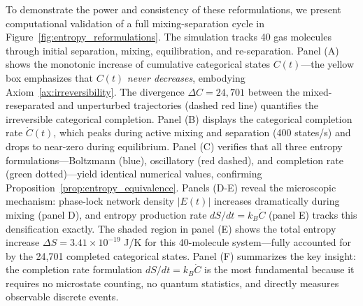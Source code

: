 To demonstrate the power and consistency of these reformulations, we present computational validation of a full mixing-separation cycle in Figure~\ref{fig:entropy_reformulations}. The simulation tracks 40 gas molecules through initial separation, mixing, equilibration, and re-separation. Panel (A) shows the monotonic increase of cumulative categorical states $C(t)$—the yellow box emphasizes that $C(t)$ \emph{never decreases}, embodying Axiom~\ref{ax:irreversibility}. The divergence $\Delta C = 24{,}701$ between the mixed-reseparated and unperturbed trajectories (dashed red line) quantifies the irreversible categorical completion. Panel (B) displays the categorical completion rate $\dot{C}(t)$, which peaks during active mixing and separation (400 states/s) and drops to near-zero during equilibrium. Panel (C) verifies that all three entropy formulations—Boltzmann (blue), oscillatory (red dashed), and completion rate (green dotted)—yield identical numerical values, confirming Proposition~\ref{prop:entropy_equivalence}. Panels (D-E) reveal the microscopic mechanism: phase-lock network density $|E(t)|$ increases dramatically during mixing (panel D), and entropy production rate $dS/dt = k_B \dot{C}$ (panel E) tracks this densification exactly. The shaded region in panel (E) shows the total entropy increase $\Delta S = 3.41 \times 10^{-19}$ J/K for this 40-molecule system—fully accounted for by the 24,701 completed categorical states. Panel (F) summarizes the key insight: the completion rate formulation $dS/dt = k_B \dot{C}$ is the most fundamental because it requires no microstate counting, no quantum statistics, and directly measures observable discrete events.

